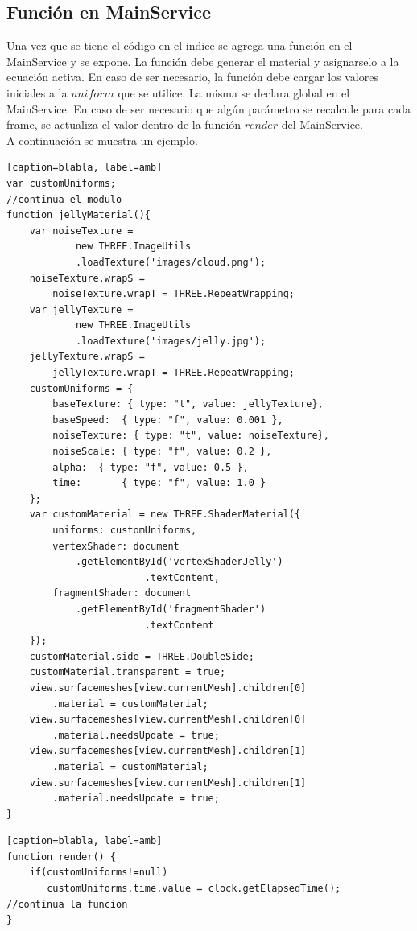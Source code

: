 \documentclass[12pt]{article}
\begin{document}
\subsection{Función en MainService}
Una vez que se tiene el código en el indice se agrega una función en el MainService y se expone. La función debe generar el material y asignarselo a la ecuación activa. En caso de ser necesario, la función debe cargar los valores iniciales a la $uniform$ que se utilice. La misma se declara global en el MainService. En caso de ser necesario que algún parámetro se recalcule para cada frame, se actualiza el valor dentro de la función $render$ del MainService.
\\A continuación se muestra un ejemplo.
\clearpage
\begin{lstlisting}[frame=single][caption=blabla, label=amb]
var customUniforms;
//continua el modulo
function jellyMaterial(){
	var noiseTexture = 
    		new THREE.ImageUtils
			.loadTexture('images/cloud.png');
	noiseTexture.wrapS = 
		noiseTexture.wrapT = THREE.RepeatWrapping; 		
	var jellyTexture = 
    		new THREE.ImageUtils
			.loadTexture('images/jelly.jpg');
	jellyTexture.wrapS = 
		jellyTexture.wrapT = THREE.RepeatWrapping; 
	customUniforms = {
		baseTexture: { type: "t", value: jellyTexture},
		baseSpeed: 	{ type: "f", value: 0.001 },
		noiseTexture: { type: "t", value: noiseTexture},
		noiseScale:	{ type: "f", value: 0.2 },
		alpha: 	{ type: "f", value: 0.5 },
		time: 		{ type: "f", value: 1.0 }
	};
	var customMaterial = new THREE.ShaderMaterial({
	    uniforms: customUniforms,
		vertexShader: document
			.getElementById('vertexShaderJelly')
        				.textContent,
		fragmentShader: document
			.getElementById('fragmentShader')
        				.textContent
	});
	customMaterial.side = THREE.DoubleSide;
	customMaterial.transparent = true;
	view.surfacemeshes[view.currentMesh].children[0]
		.material = customMaterial;
	view.surfacemeshes[view.currentMesh].children[0]
		.material.needsUpdate = true;
	view.surfacemeshes[view.currentMesh].children[1]
		.material = customMaterial;
	view.surfacemeshes[view.currentMesh].children[1]
		.material.needsUpdate = true;
}
\end{lstlisting}
\clearpage
\begin{lstlisting}[frame=single][caption=blabla, label=amb]
function render() {
	if(customUniforms!=null)
	   customUniforms.time.value = clock.getElapsedTime();
//continua la funcion
}
\end{lstlisting}
\clearpage
\end{document}

